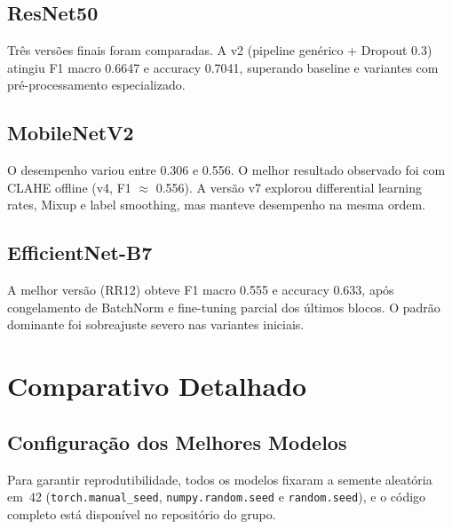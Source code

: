 \documentclass[runningheads]{llncs}
\begin{document}
\subsection{ResNet50}
Três versões finais foram comparadas. A v2 (pipeline genérico + Dropout 0.3)
atingiu F1 macro 0.6647 e accuracy 0.7041, superando baseline e variantes com
pré-processamento especializado.

\subsection{MobileNetV2}
O desempenho variou entre 0.306 e 0.556. O melhor resultado observado foi com
CLAHE offline (v4, F1 \(\approx\) 0.556). A versão v7 explorou differential
learning rates, Mixup e label smoothing, mas manteve desempenho na mesma ordem.

\subsection{EfficientNet-B7}
A melhor versão (RR12) obteve F1 macro 0.555 e accuracy 0.633, após congelamento
de BatchNorm e fine-tuning parcial dos últimos blocos. O padrão dominante foi
sobreajuste severo nas variantes iniciais.

\section{Comparativo Detalhado}

\subsection{Configuração dos Melhores Modelos}
Para garantir reprodutibilidade, todos os modelos fixaram a semente aleatória em~42
(\texttt{torch.manual\_seed}, \texttt{numpy.random.seed} e \texttt{random.seed}),
e o código completo está disponível no repositório do grupo.
\end{document}
